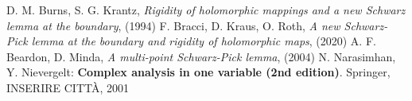 \begin{thebibliography}{widest entry}
   D. M. Burns, S. G. Krantz, \textit{Rigidity of holomorphic mappings and a new Schwarz lemma at the boundary}, (1994)
   F. Bracci, D. Kraus, O. Roth, \textit{A new Schwarz-Pick lemma at the boundary and rigidity of holomorphic maps}, (2020)
   A. F. Beardon, D. Minda, \textit{A multi-point Schwarz-Pick lemma}, (2004)
   N. Narasimhan, Y. Nievergelt: \textbf{Complex analysis in one variable (2nd edition)}. Springer, INSERIRE CITTÀ, 2001
\end{thebibliography}
